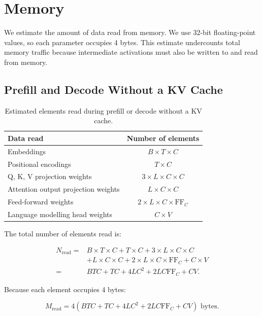\documentclass{article}
\begin{document}
\section{Memory}

We estimate the amount of data read from memory. We use 32-bit floating-point values, so each parameter occupies 4 bytes. This estimate undercounts total memory traffic because intermediate activations must also be written to and read from memory.

\subsection{Prefill and Decode Without a KV Cache}

\begin{table}[ht]
\centering
\begin{tabular}{|l|c|}
    \hline
    Data read & Number of elements \\
    \hline
    Embeddings & $B \times T \times C$ \\
    Positional encodings & $T \times C$ \\
    Q, K, V projection weights & $3 \times L \times C \times C$ \\
    Attention output projection weights & $L \times C \times C$ \\
    Feed-forward weights & $2 \times L \times C \times \mathrm{FF}_C$ \\
    Language modelling head weights & $C \times V$ \\
    \hline
\end{tabular}
\caption{Estimated elements read during prefill or decode without a KV cache.}
\label{tab:memory-reads-no-cache}
\end{table}

The total number of elements read is:

\begin{align}
N_{\mathrm{read}}
   ={}& B \times T \times C
      + T \times C
      + 3 \times L \times C \times C \\
     &+ L \times C \times C
      + 2 \times L \times C \times \mathrm{FF}_C
      + C \times V \\
   ={}& \boxed{
      BTC + TC + 4LC^2 + 2LC\mathrm{FF}_C + CV
      }.
\end{align}

Because each element occupies 4 bytes:

\begin{equation}
M_{\mathrm{read}}
   = 4\left(
      BTC + TC + 4LC^2 + 2LC\mathrm{FF}_C + CV
      \right) \text{ bytes}.
\end{equation}
\end{document}
